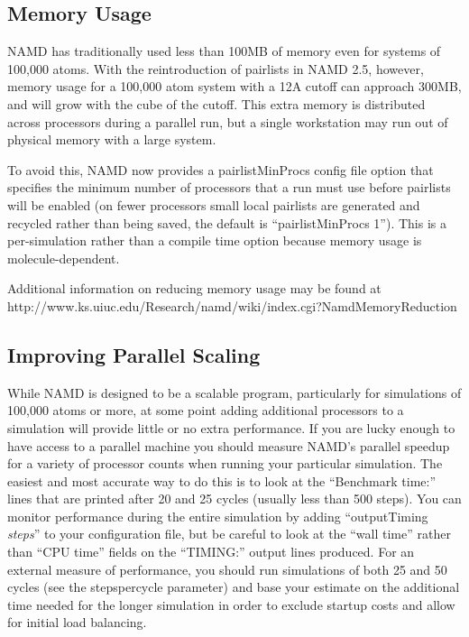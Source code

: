 \subsection{Memory Usage}

NAMD has traditionally used less than 100MB of memory even for systems
of 100,000 atoms.  With the reintroduction of pairlists in NAMD 2.5,
however, memory usage for a 100,000 atom system with a 12A cutoff can
approach 300MB, and will grow with the cube of the cutoff.  This extra
memory is distributed across processors during a parallel run, but a
single workstation may run out of physical memory with a large system.

To avoid this, NAMD now provides a pairlistMinProcs config file option
that specifies the minimum number of processors that a run must use
before pairlists will be enabled (on fewer processors small local
pairlists are generated and recycled rather than being saved, the
default is ``pairlistMinProcs 1'').  This is a per-simulation rather than
a compile time option because memory usage is molecule-dependent.

Additional information on reducing memory usage may be found at
http://www.ks.uiuc.edu/Research/namd/wiki/index.cgi?NamdMemoryReduction

\subsection{Improving Parallel Scaling}

While NAMD is designed to be a scalable program, particularly for
simulations of 100,000 atoms or more, at some point adding additional
processors to a simulation will provide little or no extra performance.
If you are lucky enough to have access to a parallel machine you should
measure NAMD's parallel speedup for a variety of processor counts when
running your particular simulation.  The easiest and most accurate way
to do this is to look at the ``Benchmark time:'' lines that are printed
after 20 and 25 cycles (usually less than 500 steps).  You can monitor
performance during the entire simulation by adding ``outputTiming {\em steps}''
to your configuration file, but be careful to look at the ``wall time''
rather than ``CPU time'' fields on the ``TIMING:'' output lines produced.
For an external measure of performance, you should run simulations of
both 25 and 50 cycles (see the stepspercycle parameter) and base your
estimate on the additional time needed for the longer simulation in
order to exclude startup costs and allow for initial load balancing.

